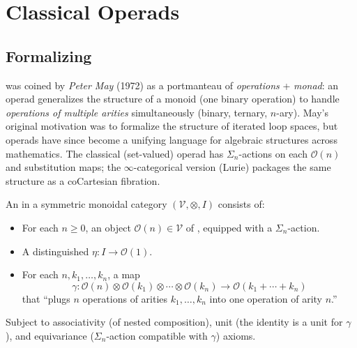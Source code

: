 \section{Classical Operads}
\label{sec:classical-operads}

\subsection{Formalizing}

\begin{nameorigin}
 was coined by \emph{Peter May} (1972) as a portmanteau of
\emph{operations} + \emph{monad}: an operad generalizes the structure of
a monoid (one binary operation) to handle \emph{operations of multiple
arities} simultaneously (binary, ternary, $n$-ary). May's original
motivation was to formalize the structure of iterated loop spaces, but
operads have since become a unifying language for algebraic structures
across mathematics. The classical (set-valued) operad has $\Sigma_n$-actions
on each $\mathcal{O}(n)$ and substitution maps; the $\infty$-categorical
version (Lurie) packages the same structure as a coCartesian fibration.
\end{nameorigin}

\begin{definition}
\label{def:operad-classical}
An  in a symmetric monoidal category $(\mathcal{V}, \otimes, I)$
consists of:
\begin{itemize}
  \item For each $n \geq 0$, an object $\mathcal{O}(n) \in \mathcal{V}$
        of , equipped with a $\Sigma_n$-action.
  \item A distinguished  $\eta : I \to \mathcal{O}(1)$.
  \item For each $n, k_1, \ldots, k_n$, a  map
        \begin{equation*}
          \gamma : \mathcal{O}(n) \otimes \mathcal{O}(k_1) \otimes \cdots \otimes \mathcal{O}(k_n) \to \mathcal{O}(k_1 + \cdots + k_n)
        \end{equation*}
        that ``plugs $n$ operations of arities $k_1, \ldots, k_n$ into one operation of arity $n$.''
\end{itemize}
Subject to associativity (of nested composition), unit (the identity is a
unit for $\gamma$), and equivariance ($\Sigma_n$-action compatible with
$\gamma$) axioms.
\end{definition}

